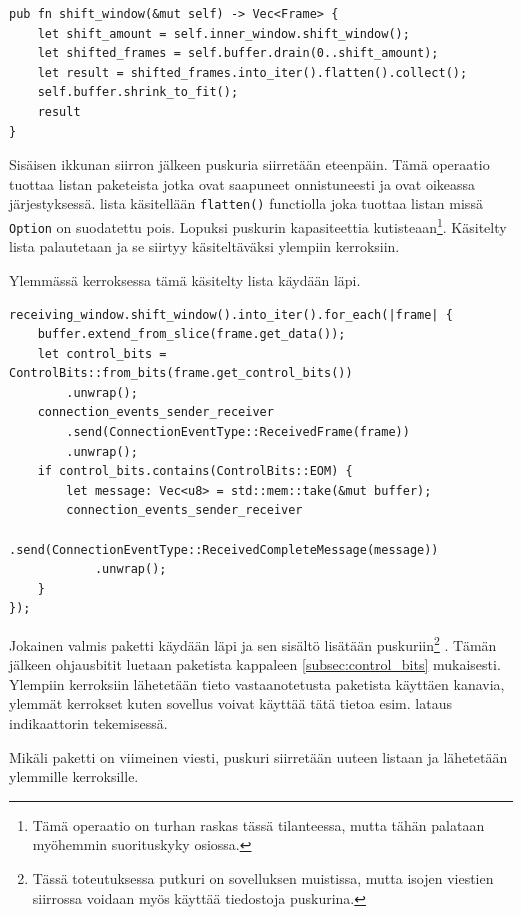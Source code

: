 \documentclass[a4paper,12pt]{article}
\begin{document}
\begin{lstlisting}[caption={Vastaanottajan ikkunan siirto}, label={lst:shift_rwindow}]
pub fn shift_window(&mut self) -> Vec<Frame> {
    let shift_amount = self.inner_window.shift_window();
    let shifted_frames = self.buffer.drain(0..shift_amount);
    let result = shifted_frames.into_iter().flatten().collect();
    self.buffer.shrink_to_fit();
    result
}
\end{lstlisting}

Sisäisen ikkunan siirron jälkeen puskuria siirretään eteenpäin. Tämä operaatio tuottaa 
listan paketeista jotka ovat saapuneet onnistuneesti ja ovat oikeassa järjestyksessä.
lista käsitellään \lstinline{flatten()} functiolla joka tuottaa listan missä \lstinline{Option} 
on suodatettu pois. Lopuksi puskurin kapasiteettia kutisteaan\footnote{Tämä operaatio on 
turhan raskas tässä tilanteessa, mutta tähän palataan myöhemmin suorituskyky osiossa.
}. Käsitelty lista palautetaan ja se siirtyy käsiteltäväksi ylempiin kerroksiin. \par

Ylemmässä kerroksessa tämä käsitelty lista käydään läpi.  

\begin{lstlisting}[caption={Pakettien käsittely}, label={lst:handle_shift_window}]
receiving_window.shift_window().into_iter().for_each(|frame| {
    buffer.extend_from_slice(frame.get_data());
    let control_bits = ControlBits::from_bits(frame.get_control_bits())
        .unwrap();
    connection_events_sender_receiver
        .send(ConnectionEventType::ReceivedFrame(frame))
        .unwrap();
    if control_bits.contains(ControlBits::EOM) {
        let message: Vec<u8> = std::mem::take(&mut buffer);
        connection_events_sender_receiver
            .send(ConnectionEventType::ReceivedCompleteMessage(message))
            .unwrap();
    }
});
\end{lstlisting}

Jokainen valmis paketti käydään läpi ja sen sisältö lisätään puskuriin\footnote{Tässä toteutuksessa putkuri on sovelluksen muistissa, mutta isojen viestien siirrossa voidaan myös käyttää tiedostoja puskurina.}
. Tämän jälkeen ohjausbitit luetaan paketista kappaleen \ref{subsec:control_bits} mukaisesti. Ylempiin kerroksiin lähetetään tieto vastaanotetusta paketista käyttäen kanavia, ylemmät kerrokset kuten sovellus voivat käyttää tätä tietoa esim. lataus indikaattorin tekemisessä. \par

Mikäli paketti on viimeinen viesti, puskuri siirretään uuteen listaan ja lähetetään ylemmille kerroksille.
\end{document}
